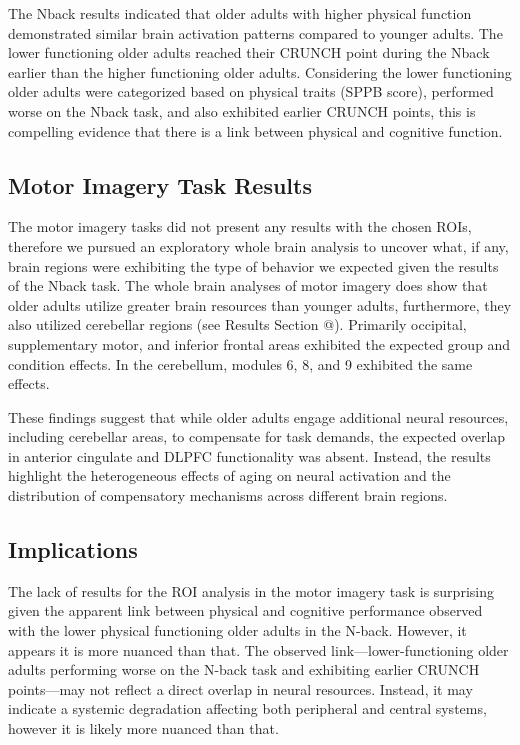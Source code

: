 \documentclass[a4paper,fleqn]{cas-sc}
\begin{document}
The Nback results indicated that older adults with higher physical function demonstrated similar brain activation patterns compared to younger adults. 
The lower functioning older adults reached their CRUNCH point during the Nback earlier than the higher functioning older adults. Considering the lower functioning older adults were categorized based on physical traits (SPPB score), performed worse on the Nback task, and also exhibited earlier CRUNCH points, this is compelling evidence that there is a link between physical and cognitive function.

\subsection{Motor Imagery Task Results}
The motor imagery tasks did not present any results with the chosen ROIs, therefore we pursued an exploratory whole brain analysis to uncover what, if any, brain regions were exhibiting the type of behavior we expected given the results of the Nback task. The whole brain analyses of motor imagery does show that older adults utilize greater brain resources than younger adults, furthermore, they also utilized cerebellar regions (see Results Section @). 
Primarily occipital, supplementary motor, and inferior frontal areas exhibited the expected group and condition effects. 
In the cerebellum, modules 6, 8, and 9 exhibited the same effects.

These findings suggest that while older adults engage additional neural resources, including cerebellar areas, to compensate for task demands, the expected overlap in anterior cingulate and DLPFC functionality was absent. Instead, the results highlight the heterogeneous effects of aging on neural activation and the distribution of compensatory mechanisms across different brain regions.


\subsection{Implications}
The lack of results for the ROI analysis in the motor imagery task is surprising given the apparent link between physical and cognitive performance observed with the lower physical functioning older adults in the N-back. However, it appears it is more nuanced than that. The observed link—lower-functioning older adults performing worse on the N-back task and exhibiting earlier CRUNCH points—may not reflect a direct overlap in neural resources. Instead, it may indicate a systemic degradation affecting both peripheral and central systems, however it is likely more nuanced than that.
\end{document}
